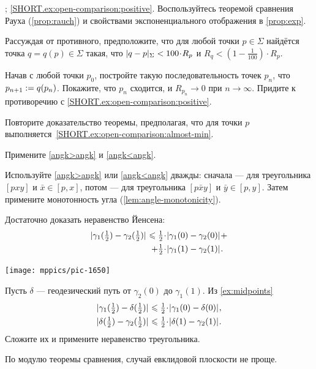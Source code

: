 \begin{multicols}{2}
\parbf{\ref{ex:open-comparison}}; \ref{SHORT.ex:open-comparison:positive}.
Воспользуйтесь теоремой сравнения Рауха (\ref{prop:rauch}) и свойствами экспоненциального отображения в \ref{prop:exp}.

Рассуждая от противного,
предположите, что для любой точки $p\in\Sigma$ найдётся точка $q=q(p)\in \Sigma$ такая, что 
$\dist{q}{p}\Sigma< 100\cdot R_p$
и
$R_q<(1-\tfrac1{100})\cdot R_p$.

Начав с любой точки $p_0$, постройте такую последовательность точек $p_n$, что $p_{n+1}\z\df q(p_n)$.
Покажите, что $p_n$ сходится, и $R_{p_n}\to 0$ при $n\to\infty$.
Придите к противоречию с \ref{SHORT.ex:open-comparison:positive}.

Повторите доказательство теоремы, предполагая, что для точки $p$ выполняется~\ref{SHORT.ex:open-comparison:almost-min}.

Примените \ref{angk>angk} и \ref{angk<angk}.

Используйте \ref{angk>angk} или \ref{angk<angk} дважды: 
сначала --- для треугольника $[pxy]$ и $\bar x\in [p,x]$, 
потом --- для треугольника $[p\bar xy]$ и $\bar y\in [p,y]$.
Затем примените монотонность угла (\ref{lem:angle-monotonicity}).

Достаточно доказать неравенство Йенсена:
\begin{align*}
\dist{\gamma_1(\tfrac12)}{\gamma_2(\tfrac12)}{}
\le
\tfrac12\cdot&\dist{\gamma_1(0)}{\gamma_2(0)}{}
+
\\
+
\tfrac12\cdot&\dist{\gamma_1(1)}{\gamma_2(1)}{}.
\end{align*}

\begin{Figure}
\vskip-0mm
\centering
\texttt{[image: mppics/pic-1650]}
\vskip1mm
\end{Figure}

Пусть $\delta$ --- геодезический путь от $\gamma_2(0)$ до $\gamma_1(1)$.
Из \ref{ex:midpoints}
\begin{align*}
\dist{\gamma_1(\tfrac12)}{\delta(\tfrac12)}{}
&\le
\tfrac12\cdot\dist{\gamma_1(0)}{\delta(0)}{},
\\
\dist{\delta(\tfrac12)}{\gamma_2(\tfrac12)}{}
&\le
\tfrac12\cdot\dist{\delta(1)}{\gamma_2(1)}{}.
\end{align*}
Сложите их и примените неравенство треугольника.

По модулю теоремы сравнения, случай евклидовой плоскости не проще.


\end{multicols}
